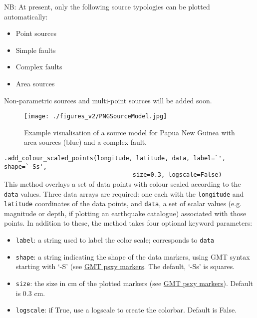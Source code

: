 NB: At present, only the following source typologies can be plotted automatically:

\begin{itemize}
\item Point sources
\item Simple faults
\item Complex faults
\item Area sources\\
\end{itemize}

Non-parametric sources and multi-point sources will be added soon.\\
 
\begin{figure}[htb]
  \centering
      \texttt{[image: ./figures\_v2/PNGSourceModel.jpg]}
	\caption{Example visualisation of a source model for Papua New Guinea \textcite{ghasemi2016} with area sources (blue) and a complex fault.}
  \label{fig:source_model_map}
\end{figure}


\noindent \verb;.add_colour_scaled_points(longitude, latitude, data, label=`', shape=`-Ss', ;\\
\verb;                                    size=0.3, logscale=False);\\

\noindent This method overlays a set of data points with colour scaled according to the \verb=data= values. Three data arrays are required: one each with the \verb=longitude= and \verb=latitude= coordinates of the data points, and \verb=data=, a set of scalar values (e.g. magnitude or depth, if plotting an earthquake catalogue) associated with those points. In addition to these, the method takes four optional keyword parameters:\\
\begin{itemize}
\item \verb=label=: a string used to label the color scale; corresponds to \verb=data=
\item \verb=shape=: a string indicating the shape of the data markers, using GMT syntax starting with `-S' (see \href{https://docs.generic-mapping-tools.org/latest/psxy.html\#s}{GMT psxy markers}. The default, `-Ss' is squares.
\item \verb=size=: the size in cm of the plotted markers (see \href{https://docs.generic-mapping-tools.org/latest/psxy.html\#s}{GMT psxy markers}). Default is 0.3 cm.
\item \verb=logscale=: if True, use a logscale to create the colorbar. Default is False.\\
\end{itemize}

